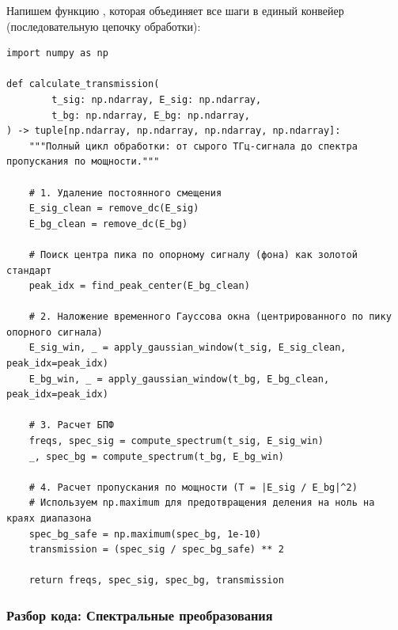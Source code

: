 Напишем функцию , которая объединяет все шаги в единый конвейер (последовательную цепочку обработки):

\begin{listing}[H]
	\caption{Конвейер расчета спектра пропускания ()}\label{lst:calculate_transmission}
	\begin{verbatim}
import numpy as np

def calculate_transmission(
        t_sig: np.ndarray, E_sig: np.ndarray,
        t_bg: np.ndarray, E_bg: np.ndarray,
) -> tuple[np.ndarray, np.ndarray, np.ndarray, np.ndarray]:
    """Полный цикл обработки: от сырого ТГц-сигнала до спектра пропускания по мощности."""
    
    # 1. Удаление постоянного смещения
    E_sig_clean = remove_dc(E_sig)
    E_bg_clean = remove_dc(E_bg)
    
    # Поиск центра пика по опорному сигналу (фона) как золотой стандарт
    peak_idx = find_peak_center(E_bg_clean)
    
    # 2. Наложение временного Гауссова окна (центрированного по пику опорного сигнала)
    E_sig_win, _ = apply_gaussian_window(t_sig, E_sig_clean, peak_idx=peak_idx)
    E_bg_win, _ = apply_gaussian_window(t_bg, E_bg_clean, peak_idx=peak_idx)
    
    # 3. Расчет БПФ
    freqs, spec_sig = compute_spectrum(t_sig, E_sig_win)
    _, spec_bg = compute_spectrum(t_bg, E_bg_win)
    
    # 4. Расчет пропускания по мощности (T = |E_sig / E_bg|^2)
    # Используем np.maximum для предотвращения деления на ноль на краях диапазона
    spec_bg_safe = np.maximum(spec_bg, 1e-10)
    transmission = (spec_sig / spec_bg_safe) ** 2
    
    return freqs, spec_sig, spec_bg, transmission
	\end{verbatim}
\end{listing}

\subsubsection{Разбор кода: Спектральные преобразования}

